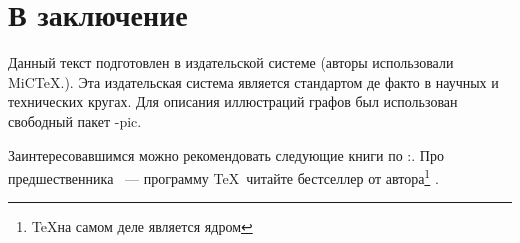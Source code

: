 \documentclass[a4paper,oneside,14pt]{scrbook}
\begin{document}
    \chapter*{В заключение}

    Данный текст подготовлен в издательской системе {\LaTeXe} (авторы использовали MiC\TeX.). Эта издательская система является стандартом де факто в научных и технических кругах. Для описания иллюстраций графов был использован свободный пакет \Xy-pic.

    Заинтересовавшимся можно рекомендовать следующие книги по \LaTeXe:\cite{bib:cotelnikov,bib:baldin,bib:lvovsky}. Про предшественника \LaTeXe\ --- программу \TeX\ читайте бестселлер от автора\footnote{\TeX на самом деле является ядром \LaTeXe} \cite{bib:knuth:AllAbout}.

    
    
\end{document}
